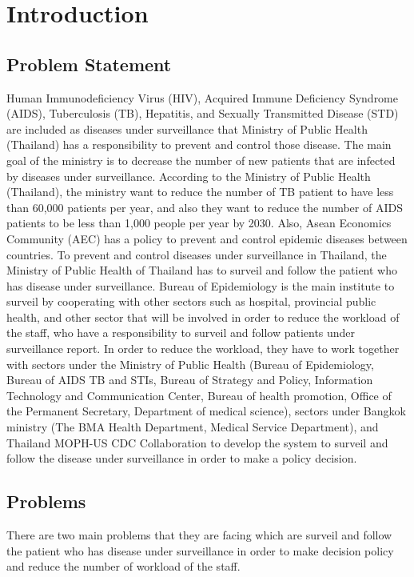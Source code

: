 \chapter{Introduction}

\section{Problem Statement}
    
    
    Human Immunodeficiency Virus (HIV), Acquired Immune Deficiency Syndrome (AIDS), Tuberculosis (TB), Hepatitis, and Sexually Transmitted Disease (STD) are included as diseases under surveillance that Ministry of Public Health (Thailand) has a responsibility to prevent and control those disease. The main goal of the ministry is to decrease the number of new patients that are infected by diseases under surveillance. According to the Ministry of Public Health (Thailand), the ministry want to reduce the number of TB patient to have less than 60,000 patients per year, and also they want to reduce the number of AIDS patients to be less than 1,000 people per year by 2030. Also, Asean Economics Community (AEC) has a policy to prevent and control epidemic diseases between countries. To prevent and control diseases under surveillance in Thailand, the Ministry of Public Health of Thailand has to surveil and follow the patient who has disease under surveillance. Bureau of Epidemiology is the main institute to surveil by cooperating with other sectors such as hospital, provincial public health, and other sector that will be involved in order to reduce the workload of the staff, who have a responsibility to surveil and follow patients under surveillance report. In order to reduce the workload, they have to work together with sectors under the Ministry of Public Health (Bureau of Epidemiology, Bureau of AIDS TB and STIs, Bureau of Strategy and Policy, Information Technology and Communication Center, Bureau of health promotion, Office of the Permanent Secretary, Department of medical science), sectors under Bangkok ministry (The BMA Health Department, Medical Service Department), and Thailand MOPH-US CDC Collaboration to develop the system to surveil and follow the disease under surveillance in order to make a policy decision.

\section{Problems} \label{section:problems}
    There are two main problems that they are facing which are surveil and follow the patient who has disease under surveillance in order to make decision policy and reduce the number of workload of the staff. 
    
